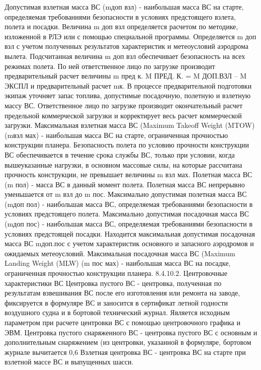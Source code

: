 Допустимая взлетная масса ВС (mдоп взл) - наибольшая масса ВС на старте, определяемая требованиями безопасности в условиях предстоящего взлета, полета и посадки.
Величина m доп взл определяется расчетом по методике, изложенной в РЛЭ или с помощью специальной программы.
Определяется m доп взл с учетом полученных результатов характеристик и метеоусловий аэродрома вылета. Подсчитанная величина m доп взл обеспечивает безопасность на всех режимах полета. По ней ответственное лицо по загрузке производит предварительный расчет величины m пред к. 
M ПРЕД. К. = M ДОП.ВЗЛ – M ЭКСПЛ
и предварительный расчет mк.
В процессе предварительной подготовки экипаж уточняет запас топлива, допустимые посадочную, полетную и взлетную массу ВС. Ответственное лицо по загрузке производит окончательный расчет предельной коммерческой загрузки и корректирует весь расчет коммерческой загрузки.
Максимальная взлетная масса ВС (Maximum Takeoff Weight (MTOW) (mвзл мах) - наибольшая масса ВС на старте, ограниченная прочностью конструкции планера.
Безопасность полета по условию прочности конструкции ВС обеспечивается в течение срока службы ВС, только при условии, когда вышеуказанные нагрузки, в основном массовые силы, на которые рассчитана прочность конструкции, не превышает величины m взл мах.
Полетная масса ВС (m пол) - масса ВС в данный момент полета.
Полетная масса ВС непрерывно уменьшается от m взл до m пос. 
Максимально допустимая полетная масса ВС (mдоп пол) - наибольшая масса ВС, определяемая требованиями безопасности в условиях предстоящего полета.
Максимально допустимая посадочная масса ВС (mдоп пос) - наибольшая масса ВС, определяемая требованиями безопасности в условиях предстоящей посадки.
Находится максимальная допустимая посадочная масса ВС mдоп.пос с учетом характеристик основного и запасного аэродромов и ожидаемых метеоусловий. 
Максимальная посадочная масса ВС (Maximum Landing Weight (MLW) (m пос мах) - наибольшая масса ВС на посадке, ограниченная прочностью конструкции планера.
8.4.10.2. Центровочные характеристики ВС
Центровка пустого ВС - центровка, полученная по результатам взвешивания ВС после его изготовления или ремонта на заводе, фиксируется в формуляре ВС и заносится в сертификат летной годности воздушного судна и в бортовой технический журнал.
Является исходным параметром при расчете центровки ВС с помощью центровочного графика и ЭВМ.
Центровка пустого снаряженного ВС - центровка пустого ВС с основным и дополнительным снаряжением (из центровки, указанной в формуляре, бортовом журнале вычитается 0,6%
Взлетная центровка ВС - центровка ВС на старте при взлетной массе ВС и выпущенных шасси.
